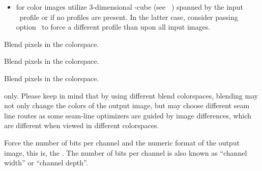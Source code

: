 \begin{codelist}
\begin{description}
\begin{itemize}
    \item
      for color images utilize 3-dimensional -cube (see
      \equationabbr~) spanned by the input ~profile
      or  if no profiles are present.  In the latter case, consider passing
      option~ to force a
      different profile than  upon all input images.
    \end{itemize}

  \item[\itempar{\code{lab} \\ \code{cielab} \\ \code{lstar} \\ \code{l-star}}]\itemend
    Blend pixels in the  colorspace.

  \item[\itempar{\code{luv} \\ \code{cieluv}}]\itemend
    Blend pixels in the  colorspace.

  \item[\itempar{\code{ciecam} \\ \code{ciecam02} \\ \code{jch}}]\itemend
    Blend pixels in the  colorspace.
  \end{description}

  \ifenblend
    \begin{restrictedmaterial}{ only.}
      Please keep in mind that by using different blend colorspaces, blending may not only
      change the colors of the output image, but  may choose different seam
      line routes as some seam-line optimizers are guided by image differences, which are
      different when viewed in different colorspaces.
    \end{restrictedmaterial}
  \fi


  \label{opt:depth}%
\item[\itempar{-d \metavar{DEPTH} \\ --depth=\metavar{DEPTH}}]\itemend
  Force the number of bits per channel and the numeric format of the output image, this is, the
  .  The number of bits per channel is also known as ``channel width'' or
  ``channel depth''.


\end{codelist}
